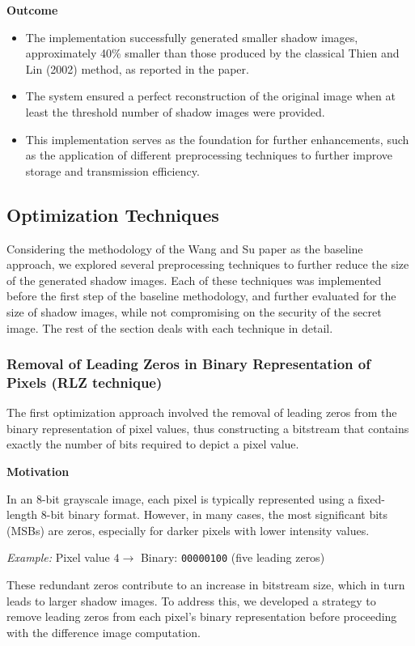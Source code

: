 \textbf{Outcome}
\begin{itemize}
    \item The implementation successfully generated smaller shadow images, approximately 40\% smaller than those produced by the classical Thien and Lin (2002) method, as reported in the paper.
    \item The system ensured a perfect reconstruction of the original image when at least the threshold number of shadow images were provided.
    \item This implementation serves as the foundation for further enhancements, such as the application of different preprocessing techniques to further improve storage and transmission efficiency.
\end{itemize}
 
\subsection{Optimization Techniques}
 
Considering the methodology of the Wang and Su paper as the baseline approach, we explored several preprocessing techniques to further reduce the size of the generated shadow images. Each of these techniques was implemented before the first step of the baseline methodology, and further evaluated for the size of shadow images, while not compromising on the security of the secret image. The rest of the section deals with each technique in detail.
 
\subsubsection{Removal of Leading Zeros in Binary Representation of Pixels (RLZ technique)}
 
The first optimization approach involved the removal of leading zeros from the binary representation of pixel values, thus constructing a bitstream that contains exactly the number of bits required to depict a pixel value.
 
\textbf{Motivation}
 
In an 8-bit grayscale image, each pixel is typically represented using a fixed-length 8-bit binary format. However, in many cases, the most significant bits (MSBs) are zeros, especially for darker pixels with lower intensity values.
 
\textit{Example:} Pixel value $4 \rightarrow$ Binary: \texttt{00000100} (five leading zeros)
 
These redundant zeros contribute to an increase in bitstream size, which in turn leads to larger shadow images. To address this, we developed a strategy to remove leading zeros from each pixel's binary representation before proceeding with the difference image computation.
 
